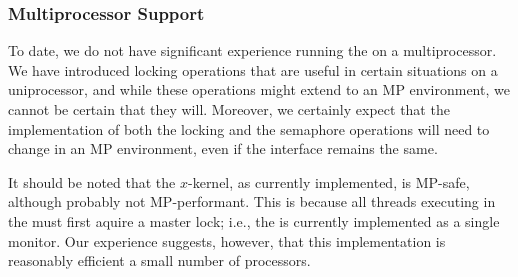 \subsubsection{Multiprocessor Support}

To date, we do not have significant experience running the \xk{} on a
multiprocessor. We have introduced locking operations that are useful
in certain situations on a uniprocessor, and while these operations
might extend to an MP environment, we cannot be certain that they
will. Moreover, we certainly expect that the implementation of both
the locking and the semaphore operations will need to change in an MP
environment, even if the interface remains the same.

It should be noted that the $x$-kernel, as currently implemented, is
MP-safe, although probably not MP-performant. This is because all
threads executing in the \xk{} must first aquire a master lock; i.e.,
the \xk{} is currently implemented as a single monitor. Our experience
suggests, however, that this implementation is reasonably efficient
a small number of processors.


